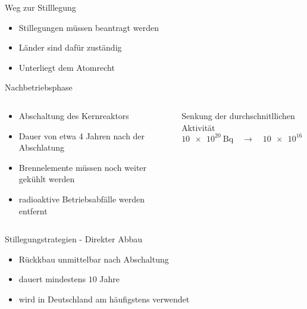 \begin{frame}{ Weg zur Stilllegung }
  \begin{itemize}
    \setlength\itemsep{1.2em}
      \item{ Stillegungen müssen beantragt werden}
      \item{ Länder sind dafür zuständig}
      \item{ Unterliegt dem Atomrecht}
  \end{itemize}
\end{frame}



\begin{frame}{ Nachbetriebsphase }
  \begin{columns}

    \begin{column}{0.48\textwidth}

        \begin{itemize}
          \setlength\itemsep{1.2em}
          \item{ Abschaltung des Kernreaktors }
          \item{ Dauer von etwa 4 Jahren nach der Abschlatung}
          \item{ Brennelemente müssen noch weiter gekühlt werden }
          \item{ radioaktive Betriebsabfälle werden entfernt }
        \end{itemize}

    \end{column}

    \begin{column}{0.48\textwidth}
      Senkung der durchschnitllichen Aktivität
      \begin{equation*}
        \SI{10e20}{\becquerel} \quad \rightarrow  \quad \SI{10e16}{\becquerel}
      \end{equation*}
    \end{column}

  \end{columns}
\end{frame}



\begin{frame}{Stillegungstrategien - Direkter Abbau}
  \begin{itemize}
    \setlength\itemsep{1.2em}
      \item{ Rückkbau unmittelbar nach Abschaltung }
      \item{ dauert mindestens $10$ Jahre }
      \item{ wird in Deutschland am häufigstens verwendet}
  \end{itemize}
\end{frame}



